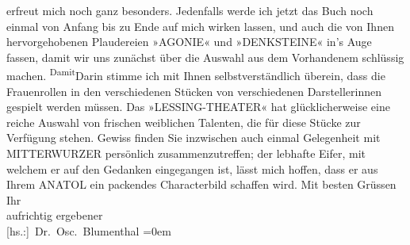 \begin{ledgroupsized}[t]{13cm}
               erfreut mich noch ganz besonders. Jedenfalls werde ich jetzt das Buch noch einmal von
               Anfang bis zu Ende auf mich wirken lassen, und auch die von Ihnen hervorgehobenen
               Plaudereien »AGONIE« und »DENKSTEINE« in’s Auge fassen, damit wir uns zunächst über die Auswahl aus dem Vorhandenem
               schlüssig machen. \substVorne{}\textsuperscript{Damit}\substDazwischen{}Darin\substHinten{} stimme ich mit Ihnen selbstverständlich überein, dass die Frauenrollen in
               den verschiedenen Stücken von verschiedenen Darstellerinnen gespielt werden müssen.
               Das »LESSING-THEATER« hat glücklicherweise eine reiche Auswahl {\pb}von frischen weiblichen Talenten, die für
               diese Stücke zur Verfügung stehen. Gewiss finden Sie inzwischen auch einmal
               Gelegenheit mit MITTERWURZER persönlich zusammenzutreffen; der lebhafte Eifer, mit welchem er auf den
               Gedanken eingegangen ist, lässt mich hoffen, dass er aus Ihrem ANATOL ein packendes Characterbild schaffen wird.\pend
           \pstart
           Mit besten Grüssen Ihr{\\[\baselineskip]} aufrichtig ergebener{\\[\baselineskip]}\spacefill\mbox{{[}hs.:{]} Dr. Osc. Blumenthal}\pend
           \leftskip=0em{}
         
         \endnumbering{}\end{ledgroupsized}  \newcommand{\dateiname}{L00623}\newcommand{\titel}{Oscar Blumenthal an Arthur Schnitzler, 19. 11. 1896}\newcommand{\editorInnen}{Martin Anton Müller und Gerd-Hermann Susen}
      